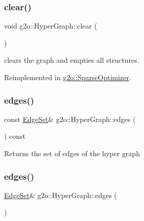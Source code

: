 \subsubsection{\texorpdfstring{clear()}{clear()}}
{\footnotesize\ttfamily void g2o\+::\+Hyper\+Graph\+::clear (\begin{DoxyParamCaption}{ }\end{DoxyParamCaption})\hspace{0.3cm}{\ttfamily [virtual]}}



clears the graph and empties all structures. 



Reimplemented in \mbox{\hyperlink{classg2o_1_1_sparse_optimizer_a4881e4ac9ba9a58d4e249dc03ef9683d}{g2o\+::\+Sparse\+Optimizer}}.

\mbox{\label{classg2o_1_1_hyper_graph_a4edfd2ef4bf235cf78031c505cfd2fcc}} 
\subsubsection{\texorpdfstring{edges()}{edges()}\hspace{0.1cm}{\footnotesize\ttfamily [1/2]}}
{\footnotesize\ttfamily const \mbox{\hyperlink{classg2o_1_1_hyper_graph_a5e2970e236c0dcb4eff7c205d7b6b4ae}{Edge\+Set}}\& g2o\+::\+Hyper\+Graph\+::edges (\begin{DoxyParamCaption}{ }\end{DoxyParamCaption}) const\hspace{0.3cm}{\ttfamily [inline]}}

\begin{DoxyReturn}{Returns}
the set of edges of the hyper graph 
\end{DoxyReturn}
\mbox{\label{classg2o_1_1_hyper_graph_a2f9f023fe2fb491ef9af873b9e683006}} 
\subsubsection{\texorpdfstring{edges()}{edges()}\hspace{0.1cm}{\footnotesize\ttfamily [2/2]}}
{\footnotesize\ttfamily \mbox{\hyperlink{classg2o_1_1_hyper_graph_a5e2970e236c0dcb4eff7c205d7b6b4ae}{Edge\+Set}}\& g2o\+::\+Hyper\+Graph\+::edges (\begin{DoxyParamCaption}{ }\end{DoxyParamCaption})\hspace{0.3cm}{\ttfamily [inline]}}

